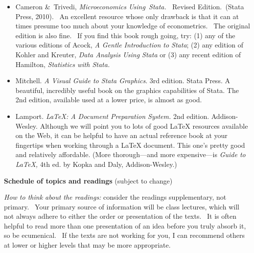 \documentclass[11pt]{article}
\begin{document}
\begin{itemize}
\item Cameron \&\ Trivedi, \textit{Microeconomics Using\ Stata. \ }Revised
Edition.\textit{\ }(Stata Press, 2010). \ An excellent resource whose only
drawback is that it can at times presume too much about your knowledge of
econometrics. \ The original edition is also fine. \ If you find this book
rough going, try: (1) any of the various editions of Acock, \textit{A Gentle
Introduction to Stata}; (2) any edition of Kohler and Kreuter, \textit{Data
Analysis Using Stata }or (3) any recent edition of Hamilton, \textit{%
Statistics with Stata. \ }\ 

\item Mitchell. \textit{A Visual Guide to Stata Graphics}. 3rd edition.
Stata Press. A beautiful, incredibly useful book on the graphics
capabilities of Stata. The 2nd edition, available used at a lower price, is
almost as good.

\item Lamport. \textit{LaTeX: A Document Preparation System. }2nd edition.
Addison-Wesley. Although we will point you to lots of good LaTeX resources
available on the Web, it can be helpful to have an actual reference book at
your fingertips when working through a LaTeX document. This one's pretty
good and relatively affordable. (More thorough---and more expensive---is 
\textit{Guide to LaTeX, }4th ed. by Kopka and Daly, Addison-Wesley.)

\bigskip
\end{itemize}

\textbf{Schedule of topics and readings }(subject to change)

\bigskip

\textit{How to think about the readings: }consider the readings
supplementary, not primary. \ Your primary source of information will be
class lectures, which will not always adhere to either the order or
presentation of the texts. \ It is often helpful to read more than one
presentation of an idea before you truly absorb it, so be ecumenical. \ If
the texts are not working for you, I can recommend others at lower or higher
levels that may be more appropriate. \ \ \ 

\bigskip
\end{document}
